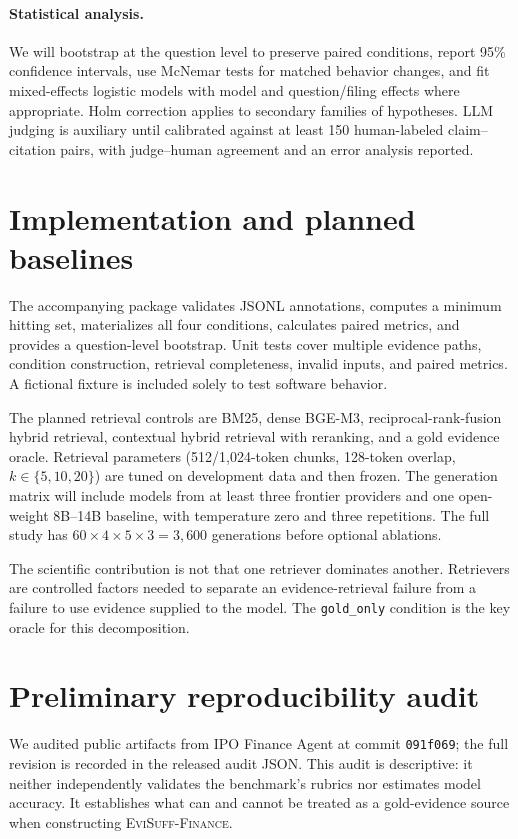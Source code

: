 \documentclass{article}
\newcommand{\benchmark}{\textsc{EviSuff-Finance}}
\begin{document}
\paragraph{Statistical analysis.}
We will bootstrap at the question level to preserve paired conditions, report
95\% confidence intervals, use McNemar tests for matched behavior changes, and
fit mixed-effects logistic models with model and question/filing effects where
appropriate. Holm correction applies to secondary families of hypotheses.
LLM judging is auxiliary until calibrated against at least 150
human-labeled claim--citation pairs, with judge--human agreement and an error
analysis reported.

\section{Implementation and planned baselines}

The accompanying package validates JSONL annotations, computes a minimum
hitting set, materializes all four conditions, calculates paired metrics, and
provides a question-level bootstrap. Unit tests cover multiple evidence paths,
condition construction, retrieval completeness, invalid inputs, and paired
metrics. A fictional fixture is included solely to test software behavior.

The planned retrieval controls are BM25, dense BGE-M3, reciprocal-rank-fusion
hybrid retrieval, contextual hybrid retrieval with reranking, and a gold
evidence oracle. Retrieval parameters (512/1,024-token chunks, 128-token
overlap, $k\in\{5,10,20\}$) are tuned on development data and then frozen.
The generation matrix will include models from at least three frontier
providers and one open-weight 8B--14B baseline, with temperature zero and
three repetitions. The full study has $60 \times 4 \times 5 \times 3 = 3{,}600$
generations before optional ablations.

The scientific contribution is not that one retriever dominates another.
Retrievers are controlled factors needed to separate an evidence-retrieval
failure from a failure to use evidence supplied to the model. The
\texttt{gold\_only} condition is the key oracle for this decomposition.

\section{Preliminary reproducibility audit}

We audited public artifacts from IPO Finance Agent at commit
\texttt{091f069}; the full revision is recorded in the released audit JSON.
This audit is descriptive:
it neither independently validates the benchmark's rubrics nor estimates model
accuracy. It establishes what can and cannot be treated as a gold-evidence
source when constructing \benchmark{}.
\end{document}
